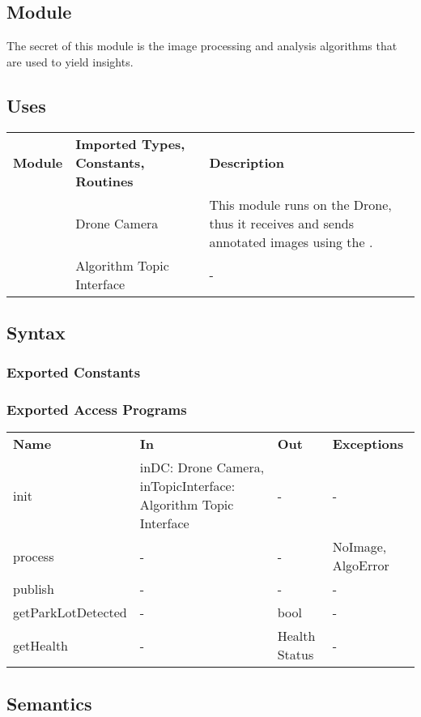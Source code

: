\documentclass[12pt, titlepage]{article}
\begin{document}
\subsection{Module}
The secret of this module is the image processing and analysis algorithms that are used to yield insights.
\subsection{Uses}
\begin{center}
\begin{tabular}{p{2 cm} p{5cm} p{6.5cm} } 
\hline
\textbf{Module} & \textbf{Imported Types, Constants, Routines} & \textbf{Description} \\
\nameref{Drone Camera} & Drone Camera & This module runs on the Drone, thus it receives and sends annotated images using the \nameref{Drone Camera}. \\
\nameref{Algorithm Topic Interface} & Algorithm Topic Interface & - \\
\hline
\hline
\end{tabular}
\end{center}
\subsection{Syntax}
\subsubsection{Exported Constants}
\subsubsection{Exported Access Programs}
\begin{center}
\begin{tabular}{p{3.5cm} p{5cm} p{2.5cm} p{2.5cm}}
\hline
\textbf{Name} & \textbf{In} & \textbf{Out} & \textbf{Exceptions} \\
init & inDC: Drone Camera, inTopicInterface: Algorithm Topic Interface & - & - \\
process & - & - & NoImage, AlgoError \\
publish & - & - & - \\
getParkLotDetected & - & bool & - \\
getHealth & - & Health Status & - \\
\hline
\hline
\end{tabular}
\end{center}
\subsection{Semantics}
\end{document}
